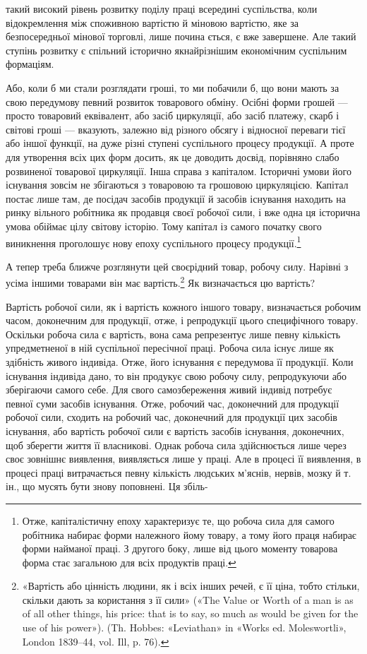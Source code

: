 \parcont{}  %
такий високий рівень розвитку поділу праці всередині суспільства,
коли відокремлення між споживною вартістю й міновою
вартістю, яке за безпосередньої мінової торговлі, лише почина
ється, є вже завершене. Але такий ступінь розвитку є спільний
історично якнайрізнішим економічним суспільним формаціям.

Або, коли б ми стали розглядати гроші, то ми побачили б,
що вони мають за свою передумову певний розвиток товарового
обміну. Осібні форми грошей — просто товаровий еквівалент,
або засіб циркуляції, або засіб платежу, скарб і світові гроші —
вказують, залежно від різного обсягу і відносної переваги тієї
або іншої функції, на дуже різні ступені суспільного процесу
продукції. А проте для утворення всіх цих форм досить, як це
доводить досвід, порівняно слабо розвиненої товарової циркуляції.
Інша справа з капіталом. Історичні умови його існування зовсім
не збігаються з товаровою та грошовою циркуляцією. Капітал
постає лише там, де посідач засобів продукції й засобів існування
находить на ринку вільного робітника як продавця своєї робочої
сили, і вже одна ця історична умова обіймає цілу світову історію.
Тому капітал із самого початку свого виникнення проголошує
нову епоху суспільного процесу продукції.\footnote{
Отже, капіталістичну епоху характеризує те, що робоча сила для
самого робітника набирає форми належного йому товару, а тому його
праця набирає форми найманої праці. З другого боку, лише від цього моменту
товарова форма стає загальною для всіх продуктів праці.
}

А тепер треба ближче розглянути цей своєрідний товар, робочу
силу. Нарівні з усіма іншими товарами він має вартість.\footnote{
«Вартість або цінність людини, як і всіх інших речей, є її ціна,
тобто стільки, скільки дають за користання з її сили» («The Value or
Worth of a man is as of all other things, his price: that is to say, so much
as would be given for the use of his power»). (Th. Hobbes: «Leviathan»
in «Works ed. Moleswortli», London 1839--44, vol. Ill, p. 76).
} Як
визначається цю вартість?

Вартість робочої сили, як і вартість кожного іншого товару,
визначається робочим часом, доконечним для продукції, отже,
і репродукції цього специфічного товару. Оскільки робоча сила
є вартість, вона сама репрезентує лише певну кількість упредметненої
в ній суспільної пересічної праці. Робоча сила існує
лише як здібність живого індивіда. Отже, його існування є передумова
її продукції. Коли існування індивіда дано, то він продукує
свою робочу силу, репродукуючи або зберігаючи самого себе.
Для свого самозбереження живий індивід потребує певної суми
засобів існування. Отже, робочий час, доконечний для продукції
робочої сили, сходить на робочий час, доконечний для продукції
цих засобів існування, або вартість робочої сили є вартість засобів
існування, доконечних, щоб зберегти життя її власникові.
Однак робоча сила здійснюється лише через своє зовнішнє виявлення,
виявляється лише у праці. Але в процесі її виявлення,
в процесі праці витрачається певну кількість людських м’яснів,
нервів, мозку й т. ін., що мусять бути знову поповнені. Ця збіль-
\parbreak{}  %
